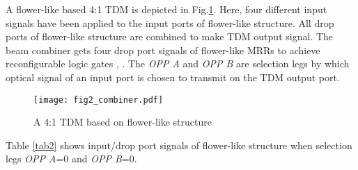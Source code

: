 \documentclass{osa-article}
\begin{document}
A flower-like based 4:1 TDM is depicted in Fig.\ref{fig2_combiner}. Here, four different input signals have been applied to the input ports of flower-like structure. All drop ports of flower-like structure are combined to make TDM output signal. The beam combiner gets four drop port signals of flower-like MRRs to achieve reconfigurable logic gates \cite{bloembergen1996nonlinear}, \cite{shen1984principles}. The \textit{OPP A} and \textit{OPP B} are selection legs by which optical signal of an input port is chosen to transmit on the TDM output port. 
\begin{figure}
\centering
	\texttt{[image: fig2\_combiner.pdf]}
	\caption{A 4:1 TDM based on flower-like structure}
	\label{fig2_combiner}
\end{figure}
Table \ref{tab2} shows input/drop port signals of flower-like structure when selection legs \textit{OPP A}=0 and \textit{OPP B}=0.
\end{document}
